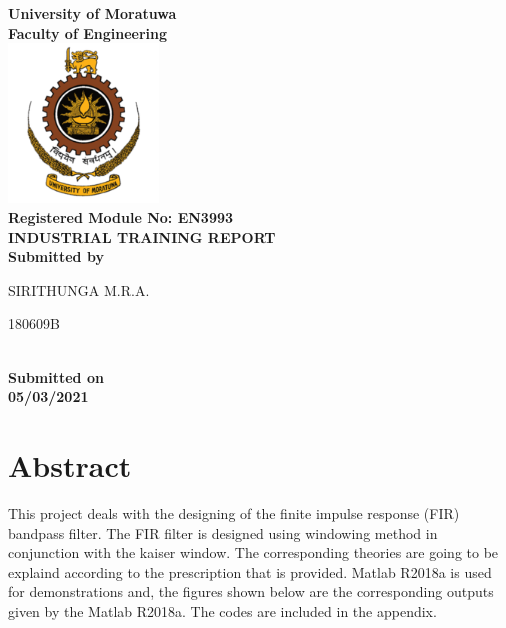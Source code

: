 \documentclass[twoside,12pt,times,onecolumn,a4paper]{report}
\begin{document}
\begin{titlepage}
\pagecolor{lightpink}\afterpage{\nopagecolor}
\center 

\textbf{\Large University of Moratuwa}\\[2cm]
\textbf{\large Faculty of Engineering}\\[2cm]

\includegraphics[width=0.3\textwidth]{uomlogo}\\[5cm]

	
\textbf{\Huge {Registered Module No: EN3993 }  }\\[2cm]
\textbf{\Huge{INDUSTRIAL TRAINING REPORT}}\\[2cm]
\vspace{5cm}
\textbf{\large Submitted by}\\[0.5cm]
\begin{minipage}{0.32\textwidth}
	\begin{flushleft}
		{\large SIRITHUNGA M.R.A. }\\[4mm]
		
	\end{flushleft}
\end{minipage}
\hspace{5mm}
\begin{minipage}{0.32\textwidth}
	\begin{flushright}
		{\large 180609B }\\[4mm]
		
	\end{flushright}
\end{minipage}\\[2cm]


\textbf{\large Submitted on}\\[0.1cm]
\textbf{\Large 05/03/2021} 

\vfill
\end{titlepage}
\tableofcontents
\listoffigures
\chapter{Abstract}
\hspace{4em}This project deals with the designing of the finite impulse response (FIR) bandpass filter. The FIR filter is designed using windowing method in conjunction with the kaiser window. The corresponding theories are going to be explaind according to the prescription that is provided. Matlab R2018a  is used for demonstrations and, the figures shown below  are the corresponding outputs given by the Matlab R2018a. The codes are included in the appendix.
\end{document}
